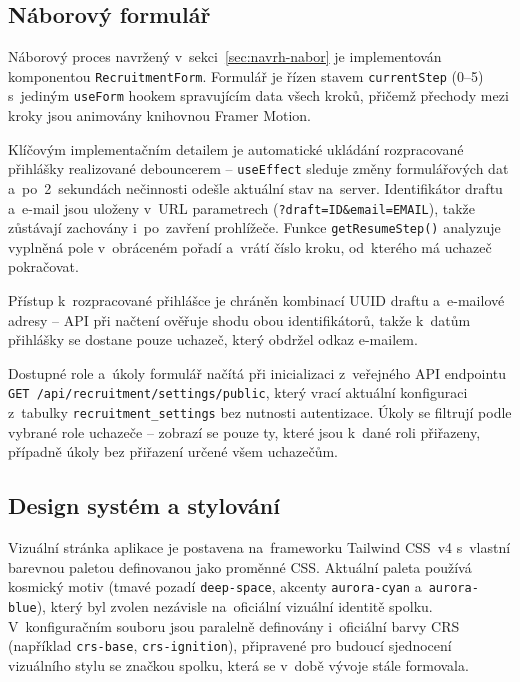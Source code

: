 \subsection{Náborový formulář}

Náborový proces navržený v~sekci~\ref{sec:navrh-nabor} je implementován komponentou \texttt{Recruitment\-Form}. Formulář je řízen stavem \texttt{current\-Step} (0--5) s~jediným \texttt{useForm} hookem spravujícím data všech kroků, přičemž přechody mezi kroky jsou animovány knihovnou Framer Motion.

\begin{sloppypar}
Klíčovým implementačním detailem je automatické ukládání rozpracované přihlášky realizované debouncerem -- \texttt{useEffect} sleduje změny formulářových dat a~po~2~sekundách nečinnosti odešle aktuální stav na~server. Identifikátor draftu a~e-mail jsou uloženy v~URL parametrech (\texttt{?draft=ID\&\allowbreak email=EMAIL}), takže zůstávají zachovány i~po~zavření prohlížeče. Funkce \texttt{get\-Resume\-Step()} analyzuje vyplněná pole v~obráceném pořadí a~vrátí číslo kroku, od~kterého má uchazeč pokračovat.
\end{sloppypar}

Přístup k~rozpracované přihlášce je chráněn kombinací UUID draftu a~e-mailové adresy -- API při načtení ověřuje shodu obou identifikátorů, takže k~datům přihlášky se dostane pouze uchazeč, který obdržel odkaz e-mailem.

Dostupné role a~úkoly formulář načítá při inicializaci z~veřejného API endpointu \texttt{GET\allowbreak{} /api/\allowbreak recruitment/\allowbreak settings/\allowbreak public}, který vrací aktuální konfiguraci z~tabulky \texttt{recruitment\-\_settings} bez nutnosti autentizace. Úkoly se filtrují podle vybrané role uchazeče -- zobrazí se pouze ty, které jsou k~dané roli přiřazeny, případně úkoly bez přiřazení určené všem uchazečům.

\subsection{Design systém a stylování}

Vizuální stránka aplikace je postavena na~frameworku Tailwind CSS~v4 s~vlastní barevnou paletou definovanou jako proměnné CSS. Aktuální paleta používá kosmický motiv (tmavé pozadí \texttt{deep-space}, akcenty \texttt{aurora-cyan} a~\texttt{aurora-blue}), který byl zvolen nezávisle na~oficiální vizuální identitě spolku. V~konfiguračním souboru jsou paralelně definovány i~oficiální barvy CRS (například \texttt{crs-base}, \texttt{crs-ignition}), připravené pro budoucí sjednocení vizuálního stylu se značkou spolku, která se v~době vývoje stále formovala.

